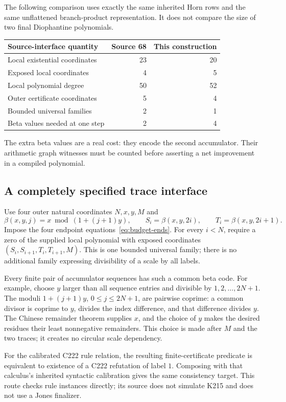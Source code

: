 The following comparison uses exactly the same inherited Horn rows and
the same unflattened branch-product representation.  It does not compare
the size of two final Diophantine polynomials.
\begin{center}
\begin{tabular}{lrr}
\hline
Source-interface quantity & Source 68 & This construction\\
\hline
Local existential coordinates & 23 & 20\\
Exposed local coordinates & 4 & 5\\
Local polynomial degree & 50 & 52\\
Outer certificate coordinates & 5 & 4\\
Bounded universal families & 2 & 1\\
Beta values needed at one step & 2 & 4\\
\hline
\end{tabular}
\end{center}
The extra beta values are a real cost: they encode the second accumulator.
Their arithmetic graph witnesses must be counted before asserting a net
improvement in a compiled polynomial.

\subsection{A completely specified trace interface}

Use four outer natural coordinates $N,x,y,M$ and
\[
 \beta(x,y,j)=x\bmod(1+(j+1)y),\qquad
 S_i=\beta(x,y,2i),\qquad T_i=\beta(x,y,2i+1).
\]
Impose the four endpoint equations~\eqref{eq:budget-ends}.  For every
$i<N$, require a zero of the supplied local polynomial with exposed
coordinates $(S_i,S_{i+1},T_i,T_{i+1},M)$.  This is one bounded universal
family; there is no additional family expressing divisibility of a scale
by all labels.

Every finite pair of accumulator sequences has such a common beta code.
For example, choose $y$ larger than all sequence entries and divisible by
$1,2,\ldots,2N+1$.  The moduli $1+(j+1)y$, $0\leq j\leq2N+1$, are
pairwise coprime: a common divisor is coprime to $y$, divides the index
difference, and that difference divides $y$.  The Chinese remainder
theorem supplies $x$, and the choice of $y$ makes the desired residues
their least nonnegative remainders.  This choice is made after $M$ and
the two traces; it creates no circular scale dependency.

For the calibrated C222 rule relation, the resulting finite-certificate
predicate is equivalent to existence of a C222 refutation of label $1$.
Composing with that calculus's inherited syntactic calibration gives the
same consistency target.  This route checks rule instances directly; its
source does not simulate K215 and does not use a Jones finalizer.

